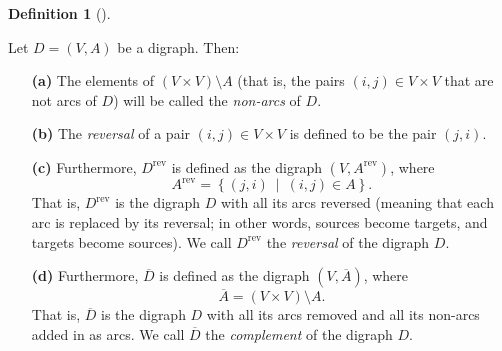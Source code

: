\documentclass[numbers=enddot,12pt,final,onecolumn,notitlepage]{scrartcl}%
\numberwithin{exer}{subsection}
\theoremstyle{definition}
\newtheorem{defi}[theo]{Definition}
\newenvironment{definition}[1][]
{\begin{defi}[#1]\begin{leftbar}}
{\end{leftbar}\end{defi}}
\begin{document}
\begin{definition}
Let $D=\left(  V,A\right)  $ be a digraph. Then:

\begin{enumerate}
\item[\textbf{(a)}] The elements of $\left(  V\times V\right)  \setminus A$
(that is, the pairs $\left(  i,j\right)  \in V\times V$ that are not arcs of
$D$) will be called the \emph{non-arcs} of $D$.

\item[\textbf{(b)}] The \emph{reversal} of a pair $\left(  i,j\right)  \in
V\times V$ is defined to be the pair $\left(  j,i\right)  $.

\item[\textbf{(c)}] Furthermore, $D^{\operatorname*{rev}}$ is defined as the
digraph $\left(  V,A^{\operatorname*{rev}}\right)  $, where%
\[
A^{\operatorname*{rev}}=\left\{  \left(  j,i\right)  \ \mid\ \left(
i,j\right)  \in A\right\}  .
\]
That is, $D^{\operatorname*{rev}}$ is the digraph $D$ with all its arcs
reversed (meaning that each arc is replaced by its reversal; in other words,
sources become targets, and targets become sources). We call
$D^{\operatorname*{rev}}$ the \emph{reversal} of the digraph $D$.

\item[\textbf{(d)}] Furthermore, $\overline{D}$ is defined as the digraph
$\left(  V,\overline{A}\right)  $, where%
\[
\overline{A}=\left(  V\times V\right)  \setminus A.
\]
That is, $\overline{D}$ is the digraph $D$ with all its arcs removed and all
its non-arcs added in as arcs. We call $\overline{D}$ the \emph{complement} of
the digraph $D$.
\end{enumerate}
\end{definition}
\end{document}
